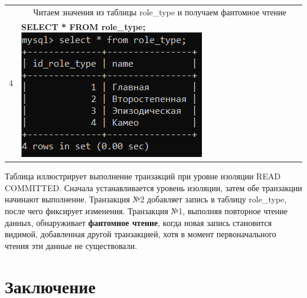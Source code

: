 \documentclass[11pt,a4paper,final]{article} %
\begin{document}
\begin{table}[H]
\begin{tabularx}{\textwidth}{|c|X|X|}
		
		\multirow{3}{*}{4} & \multicolumn{2}{c|}{Читаем значения из таблицы role\_type и получаем фантомное чтение}\\
		\cline{2-3}
		& 
		\vspace{-6pt}
		\hspace{-8.5pt}
		\textbf{SELECT * FROM role\_type;}
		\includegraphics[width=1\linewidth]{pic24.png}
		& 
		\vspace{-6pt}
		\hspace{-8.5pt}
		\\
		\cline{1-3}
		
	\end{tabularx}
\end{table}		
		
\par Таблица иллюстрирует выполнение транзакций при уровне изоляции READ COMMITTED. Сначала устанавливается уровень изоляции, затем обе транзакции начинают выполнение. Транзакция №2 добавляет запись в таблицу role\_type, после чего фиксирует изменения. Транзакция №1, выполняя повторное чтение данных, обнаруживает \textbf{фантомное чтение}, когда новая запись становится видимой, добавленная другой транзакцией, хотя в момент первоначального чтения эти данные не существовали.	


\newpage
\section*{Заключение}
\end{document}
